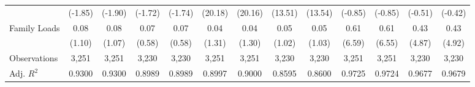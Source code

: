 \begin{landscape}
\begin{table}[!ht]
\begin{tabular}{l*{12}{c}}
             & (-1.85) & (-1.90) & (-1.72) & (-1.74) & (20.18) & (20.16) & (13.51) & (13.54) & (-0.85) & (-0.85) & (-0.51) & (-0.42) \\
            [0.3em]
            Family Loads & 0.08 & 0.08 & 0.07 & 0.07 & 0.04 & 0.04 & 0.05 & 0.05 & 0.61\sym{***} & 0.61\sym{***} & 0.43\sym{***} & 0.43\sym{***} \\
             & (1.10) & (1.07) & (0.58) & (0.58) & (1.31) & (1.30) & (1.02) & (1.03) & (6.59) & (6.55) & (4.87) & (4.92) \\
            
            \midrule
            
            Observations & 3,251 & 3,251 & 3,230 & 3,230 & 3,251 & 3,251 & 3,230 & 3,230 & 3,251 & 3,251 & 3,230 & 3,230 \\
            Adj. $R^{2}$ & 0.9300 & 0.9300 & 0.8989 & 0.8989 & 0.8997 & 0.9000 & 0.8595 & 0.8600 & 0.9725 & 0.9724 & 0.9677 & 0.9679 \\
            
            \bottomrule
        \end{tabular}

        \egroup%
    \end{table}
\end{landscape}